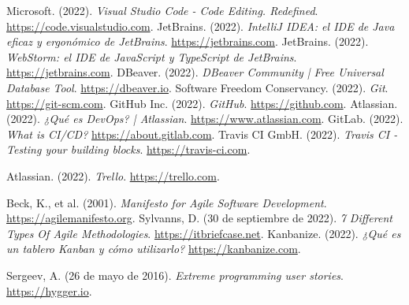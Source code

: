\begin{thebibliography}{99}
     Microsoft. (2022). \textit{Visual Studio Code - Code Editing. Redefined}. \href{https://code.visualstudio.com}{https://code.visualstudio.com}.
     JetBrains. (2022). \textit{IntelliJ IDEA: el IDE de Java eficaz y ergonómico de JetBrains}. \href{https://www.jetbrains.com/es-es/idea/}{https://jetbrains.com}.
     JetBrains. (2022). \textit{WebStorm: el IDE de JavaScript y TypeScript de JetBrains}. \href{https://www.jetbrains.com/es-es/webstorm/}{https://jetbrains.com}.
     DBeaver. (2022). \textit{DBeaver Community | Free Universal Database Tool}. \href{https://dbeaver.io}{https://dbeaver.io}.
     Software Freedom Conservancy. (2022). \textit{Git}. \href{https://git-scm.com}{https://git-scm.com}.
     GitHub Inc. (2022). \textit{GitHub}. \href{https://github.com/about}{https://github.com}.
     Atlassian. (2022). \textit{¿Qué es DevOps? | Atlassian}. \href{https://www.atlassian.com/es/devops/}{https://www.atlassian.com}.
     GitLab. (2022). \textit{What is CI/CD?} \href{https://about.gitlab.com/topics/ci-cd/}{https://about.gitlab.com}.
     Travis CI GmbH. (2022). \textit{Travis CI - Testing your building blocks}. \href{https://www.travis-ci.com/about-us/}{https://travis-ci.com}.

     Atlassian. (2022). \textit{Trello}. \href{https://trello.com}{https://trello.com}.

     Beck, K., et al. (2001). \textit{Manifesto for Agile Software Development}. \href{https://agilemanifesto.org}{https://agilemanifesto.org}.
     Sylvanns, D. (30 de septiembre de 2022). \textit{7 Different Types Of Agile Methodologies}. \href{https://www.itbriefcase.net/7-different-types-of-Agile-methodologies}{https://itbriefcase.net}.
     Kanbanize. (2022). \textit{¿Qué es un tablero Kanban y cómo utilizarlo?} \href{https://kanbanize.com/es/recursos-de-kanban/primeros-pasos/que-es-tablero-kanban}{https://kanbanize.com}.

     Sergeev, A. (26 de mayo de 2016). \textit{Extreme programming user stories}. \href{https://hygger.io/blog/extreme-programming-user-stories/}{https://hygger.io}.


\end{thebibliography}
